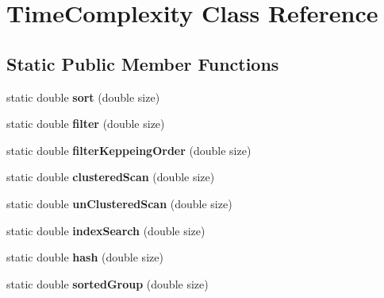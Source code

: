 \hypertarget{class_time_complexity}{\section{Time\+Complexity Class Reference}
\label{class_time_complexity}
}
\subsection*{Static Public Member Functions}
\begin{DoxyCompactItemize}
\item 
\hypertarget{class_time_complexity_ab84b18ddf8b7af7725dd0f2d90e8f7ae}{static double {\bfseries sort} (double size)}\label{class_time_complexity_ab84b18ddf8b7af7725dd0f2d90e8f7ae}

\item 
\hypertarget{class_time_complexity_ad12440b18c1a3a2924cf6836f0b04c4b}{static double {\bfseries filter} (double size)}\label{class_time_complexity_ad12440b18c1a3a2924cf6836f0b04c4b}

\item 
\hypertarget{class_time_complexity_ac3d406914d7421b7ae762edd039cc9fb}{static double {\bfseries filter\+Keppeing\+Order} (double size)}\label{class_time_complexity_ac3d406914d7421b7ae762edd039cc9fb}

\item 
\hypertarget{class_time_complexity_a26a439592bc7d74dce99ff66fc9c45ed}{static double {\bfseries clustered\+Scan} (double size)}\label{class_time_complexity_a26a439592bc7d74dce99ff66fc9c45ed}

\item 
\hypertarget{class_time_complexity_a9b9a3434b75473198bf7e2c0c4ec2e80}{static double {\bfseries un\+Clustered\+Scan} (double size)}\label{class_time_complexity_a9b9a3434b75473198bf7e2c0c4ec2e80}

\item 
\hypertarget{class_time_complexity_ae6fc889627b5bd1d513998729e8e2b08}{static double {\bfseries index\+Search} (double size)}\label{class_time_complexity_ae6fc889627b5bd1d513998729e8e2b08}

\item 
\hypertarget{class_time_complexity_a84061694749a7148d93ea55674c9ecbd}{static double {\bfseries hash} (double size)}\label{class_time_complexity_a84061694749a7148d93ea55674c9ecbd}

\item 
\hypertarget{class_time_complexity_aa8fa3fdb0f32cf1d2753271c0979e8d4}{static double {\bfseries sorted\+Group} (double size)}\label{class_time_complexity_aa8fa3fdb0f32cf1d2753271c0979e8d4}


\end{DoxyCompactItemize}
